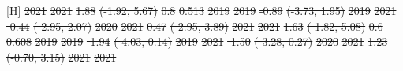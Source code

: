 \documentclass[
  letterpaper,
  DIV=11,
  numbers=noendperiod]{scrartcl}
\makeatletter
\renewenvironment{table}%
   {\renewcommand\familydefault\sfdefault
    \@float{table}}
   {\end@float}
\providecommand{\DIFdel}[1]{{\protect\color{red}\sout{#1}}}                      %
\providecommand{\DIFdelFL}[1]{\DIFdel{#1}} %
\makeatother
\begin{document}
\begin{table}[H]
\DIFdelFL{\hspace{1em}2021 }%
\DIFdelFL{2021 }%
\DIFdelFL{1.88 }%
\DIFdelFL{(-1.92, 5.67) }%
\DIFdelFL{0.8 }%
\DIFdelFL{0.513}%
\DIFdelFL{\hspace{1em}2019 }%
\DIFdelFL{2019 }%
\DIFdelFL{-0.89 }%
\DIFdelFL{(-3.73, 1.95) }%
\DIFdelFL{\hspace{1em}2019 }%
\DIFdelFL{2021 }%
\DIFdelFL{-0.44 }%
\DIFdelFL{(-2.95, 2.07) }%
\DIFdelFL{\hspace{1em}2020 }%
\DIFdelFL{2021 }%
\DIFdelFL{0.47 }%
\DIFdelFL{(-2.95, 3.89) }%
\DIFdelFL{\hspace{1em}2021 }%
\DIFdelFL{2021 }%
\DIFdelFL{1.63 }%
\DIFdelFL{(-1.82, 5.08) }%
\DIFdelFL{0.6 }%
\DIFdelFL{0.608}%
\DIFdelFL{\hspace{1em}2019 }%
\DIFdelFL{2019 }%
\DIFdelFL{-1.94 }%
\DIFdelFL{(-4.03, 0.14) }%
\DIFdelFL{\hspace{1em}2019 }%
\DIFdelFL{2021 }%
\DIFdelFL{-1.50 }%
\DIFdelFL{(-3.28, 0.27) }%
\DIFdelFL{\hspace{1em}2020 }%
\DIFdelFL{2021 }%
\DIFdelFL{1.23 }%
\DIFdelFL{(-0.70, 3.15) }%
\DIFdelFL{\hspace{1em}2021 }%
\DIFdelFL{2021 }%

\end{table}
\end{document}
